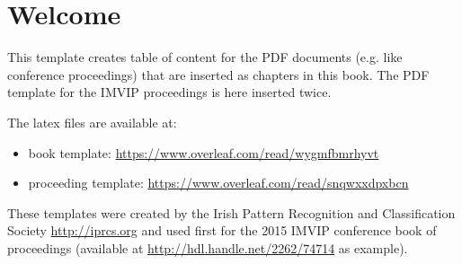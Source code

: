 \documentclass[a4paper,11pt,oneside]{book}
\begin{document}
\thispagestyle{empty}


\frontmatter

\chapter{Welcome }


This template creates table of content for the PDF documents (e.g. like conference proceedings) that are inserted as chapters in this book. The PDF template for the IMVIP proceedings is here inserted twice. 

The latex files are available at:
\begin{itemize}
\item  book template: \url{https://www.overleaf.com/read/wygmfbmrhyvt}

\item proceeding  template: \url{https://www.overleaf.com/read/snqwxxdpxbcn}
  
\end{itemize}
These templates were  created by the Irish Pattern Recognition and Classification Society \url{http://iprcs.org} and used first for  the 2015 IMVIP conference book of proceedings (available at \url{http://hdl.handle.net/2262/74714} as example).



\renewcommand{\contentsname}{Table of Contents}
\tableofcontents \pagestyle{fancy}

\mainmatter 








\backmatter
\thispagestyle{empty}

\end{document}
